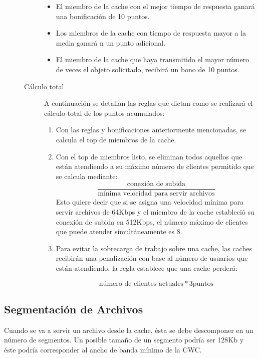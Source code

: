 \begin{description}
\begin{description}
		\begin{itemize}
		\item El miembro de la cache con el mejor tiempo de respuesta ganará una bonificación de 10 puntos.
		\item Los miembros de la cache con tiempo de respuesta mayor a la media ganará	n un punto adicional.
		\item El miembro de la cache que haya transmitido el mayor número de veces el  objeto solicitado, recibirá un bono de 10 puntos.
		\end{itemize}

	\item[Cálculo total] A continuación se detallan las reglas que dictan como se realizará el cálculo total de los puntos acumulados: 
	
		\begin{enumerate}
		\item Con las reglas y bonificaciones anteriormente mencionadas, se calcula el top de miembros de la cache.
		\item Con el top de miembros listo, se eliminan todos aquellos que están atendiendo a su máximo número de clientes permitido que se calcula mediante: 
		$$ \frac {\text{conexión de subida}}{\text{mínima velocidad para servir archivos}} $$ 
		Esto quiere decir que si se asigna una velocidad mínima para servir archivos de 64Kbps y el miembro de la cache estableció su conexión de subida en 512Kbps, el número máximo de clientes que puede atender simultáneamente es 8.
		\item Para evitar la sobrecarga de trabajo sobre una cache, las caches recibirán una penalización con base al número de usuarios que están atendiendo, la regla establece que una cache perderá: 
		
		$$ \text{número de clientes actuales} * 3 \text{puntos} $$
		\end{enumerate}
	
	\end{description}

\end{description}


\subsection{Segmentación de Archivos}

Cuando se va a servir un archivo desde la cache, ésta se debe descomponer en un número de segmentos. Un posible tamaño de un segmento podría ser 128Kb y éste podría corresponder al ancho de banda mínimo de la CWC. 

